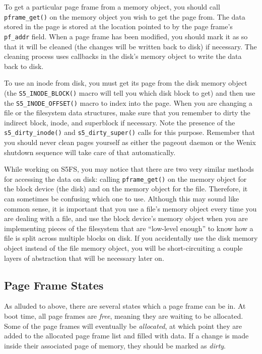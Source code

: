 To get a particular page frame from a memory object, you should call \texttt{pframe\_get()} on the memory object you wish to get the page from. The data stored in the page is stored at the location pointed to by the page frame's \texttt{pf\_addr} field. When a page frame has been modified, you should mark it as  so that it will be cleaned (the changes will be written back to disk) if necessary. The cleaning process uses callbacks in the disk's memory object to write the data back to disk.

To use an inode from disk, you must get its page from the disk memory object (the \texttt{S5\_INODE\_BLOCK()} macro will tell you which disk block to get) and then use the \texttt{S5\_INODE\_OFFSET()} macro to index into the page. When you are changing a file or the filesystem data structures, make sure that you remember to dirty the indirect block, inode, and superblock if necessary. Note the presence of the \texttt{s5\_dirty\_inode()} and \texttt{s5\_dirty\_super()} calls for this purpose. Remember that you should never clean pages yourself as either the pageout daemon or the Wenix shutdown sequence will take care of that automatically.

While working on S5FS, you may notice that there are two very similar methods for accessing the data on disk: calling \texttt{pframe\_get()} on the memory object for the block device (the disk) and on the memory object for the file. Therefore, it can sometimes be confusing which one to use. Although this may sound like common sense, it is important that you use a file's memory object every time you are dealing with a file, and use the block device's memory object when you are implementing pieces of the filesystem that are ``low-level enough'' to know how a file is split across multiple blocks on disk. If you accidentally use the disk memory object instead of the file memory object, you will be short-circuiting a couple layers of abstraction that will be necessary later on.

\subsection{Page Frame States} \label{pf-states}

As alluded to above, there are several states which a page frame can be in. At boot time, all page frames are \emph{free}, meaning they are waiting to be allocated. Some of the page frames will eventually be \emph{allocated}, at which point they are added to the allocated page frame list and filled with data. If a change is made inside their associated page of memory, they should be marked as \emph{dirty}.

